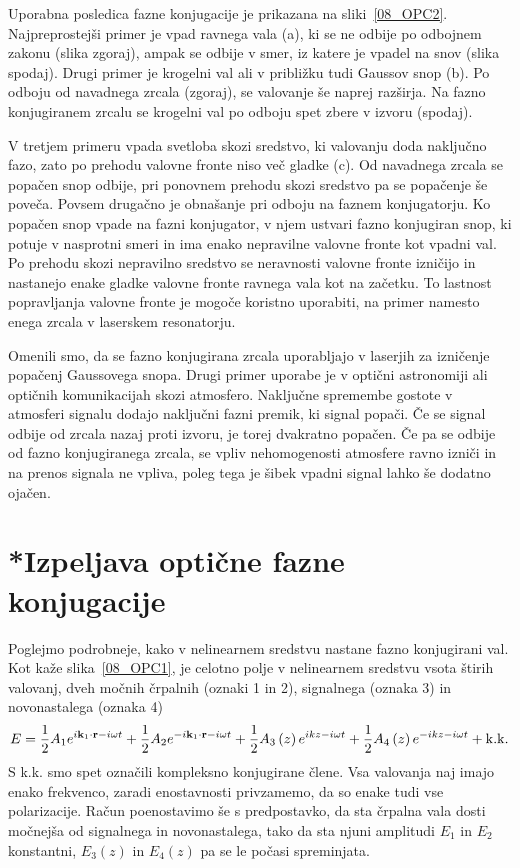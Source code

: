 Uporabna posledica fazne konjugacije je prikazana na sliki~\ref{08_OPC2}.
Najpreprostejši primer je vpad ravnega vala (a), ki se ne odbije po 
odbojnem zakonu (slika zgoraj), ampak se odbije v smer, iz katere 
je vpadel na snov (slika spodaj). Drugi primer je krogelni val 
ali v približku tudi Gaussov snop (b). Po odboju od navadnega zrcala (zgoraj), se 
valovanje še naprej razširja. Na fazno konjugiranem zrcalu se krogelni val po odboju spet
zbere v izvoru (spodaj). 

V tretjem primeru vpada svetloba skozi sredstvo, ki valovanju doda naključno
fazo, zato po prehodu valovne fronte niso več gladke (c). Od navadnega zrcala
se popačen snop odbije, pri ponovnem prehodu skozi sredstvo pa se popačenje
še poveča. Povsem drugačno je obnašanje pri odboju na faznem konjugatorju. 
Ko popačen snop vpade na fazni konjugator, v njem ustvari fazno konjugiran snop, 
ki potuje v nasprotni smeri in ima enako nepravilne valovne fronte kot vpadni val. Po prehodu
skozi nepravilno sredstvo se neravnosti valovne fronte izničijo
in nastanejo enake gladke valovne fronte ravnega vala kot na začetku. 
To lastnost popravljanja valovne fronte je mogoče 
koristno uporabiti, na primer namesto enega zrcala v laserskem resonatorju.
\begin{remark}
Omenili smo, da se fazno konjugirana zrcala uporabljajo v laserjih za izničenje
popačenj Gaussovega snopa. Drugi primer uporabe je v optični astronomiji
ali optičnih komunikacijah skozi atmosfero. Naključne spremembe gostote v atmosferi
signalu dodajo naključni fazni premik, ki signal popači. Če se signal odbije od zrcala nazaj
proti izvoru, je torej dvakratno popačen. Če pa se odbije od fazno konjugiranega zrcala, 
se vpliv nehomogenosti atmosfere ravno izniči in na prenos signala ne vpliva, poleg
tega je šibek vpadni signal lahko še dodatno ojačen. 
\end{remark}

\section{*Izpeljava optične fazne konjugacije}
Poglejmo podrobneje, kako v nelinearnem sredstvu nastane fazno konjugirani
val. Kot kaže slika~\ref{08_OPC1}, je celotno polje v nelinearnem
sredstvu vsota štirih valovanj, dveh močnih črpalnih (oznaki 1 in 2), signalnega 
(oznaka 3) in novonastalega (oznaka 4)
\begin{equation}
E=\frac{1}{2}A_{1}e^{i{\bf k}_{1}\cdot{\bf r}-i\omega t}+\frac{1}{2}A_{2}e^{-i{\bf k}_{1}\cdot{\bf r}-
i\omega t}+\frac{1}{2}A_{3}\left(z\right)e^{ikz-i\omega t}+\frac{1}{2}A_{4}
\left(z\right)e^{-ikz-i\omega t}+{\rm k.k.}
\label{8.99}
\end{equation}
S k.k. smo spet označili kompleksno konjugirane člene.  Vsa valovanja naj imajo
enako frekvenco, zaradi enostavnosti privzamemo, da so enake tudi vse polarizacije.
Račun poenostavimo še s predpostavko, da sta črpalna vala dosti močnejša 
od signalnega in novonastalega, tako da sta njuni
amplitudi $E_{1}$ in $E_{2}$ konstantni, $E_{3}\left(z\right)$ in $E_{4}\left(z\right)$
pa se le počasi spreminjata.

